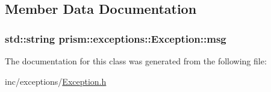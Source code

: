 \subsection{Member Data Documentation}
\subsubsection[{\texorpdfstring{msg}{msg}}]{\setlength{\rightskip}{0pt plus 5cm}std\+::string prism\+::exceptions\+::\+Exception\+::msg\hspace{0.3cm}{\ttfamily [protected]}}\hypertarget{classprism_1_1exceptions_1_1_exception_a46b99086173d8f609064dc3974703573}{}\label{classprism_1_1exceptions_1_1_exception_a46b99086173d8f609064dc3974703573}


The documentation for this class was generated from the following file\+:\begin{DoxyCompactItemize}
\item 
inc/exceptions/\hyperlink{_exception_8h}{Exception.\+h}\end{DoxyCompactItemize}
